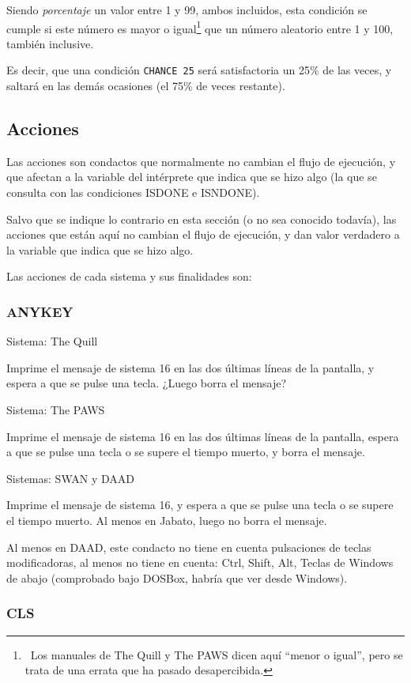 \documentclass[11pt, a5paper]{article}
\newcommand{\quill}{\textsf{The Quill}\xspace}
\newcommand{\paw}{\textsf{The PAWS}\xspace}
\newcommand{\swan}{\textsf{SWAN}\xspace}
\newcommand{\daad}{\textsf{DAAD}\xspace}
\newcommand{\sistema}[1]{\noindent Sistema: #1 \nopagebreak}
\newcommand{\sistemas}[1]{\noindent Sistemas: #1 \nopagebreak}
\begin{document}
Siendo \emph{porcentaje} un valor entre 1 y 99, ambos incluidos, esta condición se cumple si este número es mayor o igual\footnote{\ Los manuales de \quill y \paw dicen aquí ``menor o igual'', pero se trata de una errata que ha pasado desapercibida.} que un número aleatorio entre 1 y 100, también inclusive.

Es decir, que una condición \texttt{CHANCE 25} será satisfactoria un 25\% de las veces, y saltará en las demás ocasiones (el 75\% de veces restante).


\subsection{Acciones}

Las acciones son condactos que normalmente no cambian el flujo de ejecución, y que afectan a la variable del intérprete que indica que se hizo algo (la que se consulta con las condiciones ISDONE e ISNDONE).

Salvo que se indique lo contrario en esta sección (o no sea conocido todavía), las acciones que están aquí no cambian el flujo de ejecución, y dan valor verdadero a la variable que indica que se hizo algo.

Las acciones de cada sistema y sus finalidades son:

\subsubsection{ANYKEY}

\sistema{\quill}

Imprime el mensaje de sistema 16 en las dos últimas líneas de la pantalla, y espera a que se pulse una tecla. ¿Luego borra el mensaje?

\sistema{\paw}

Imprime el mensaje de sistema 16 en las dos últimas líneas de la pantalla, espera a que se pulse una tecla o se supere el tiempo muerto, y borra el mensaje.

\sistemas{\swan y \daad}

Imprime el mensaje de sistema 16, y espera a que se pulse una tecla o se supere el tiempo muerto. Al menos en Jabato, luego no borra el mensaje.

Al menos en \daad, este condacto no tiene en cuenta pulsaciones de teclas modificadoras, al menos no tiene en cuenta: Ctrl, Shift, Alt, Teclas de Windows de abajo (comprobado bajo DOSBox, habría que ver desde Windows).

\subsubsection{CLS}
\end{document}
